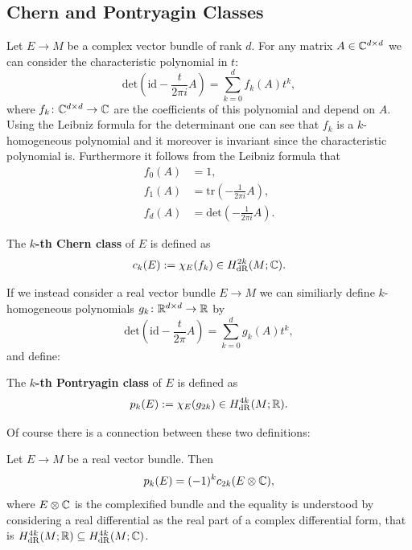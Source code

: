 \subsection{Chern and Pontryagin Classes}

    Let $E \to M$ be a complex vector bundle of rank $d$. For any matrix $A \in \mathbb{C}^{d \times d}$ we can consider the characteristic polynomial in $t$:
    \[
    \mathrm{det}\left( \mathrm{id} - \frac{t}{2\pi i} A\right) = \sum_{k=0}^{d} f_k(A)t^k,
    \]
    where $f_k \colon \mathbb{C}^{d \times d} \to \mathbb{C}$ are the coefficients of this polynomial and depend on $A$. Using the Leibniz formula for the determinant one can see that $f_k$ is a $k$-homogeneous polynomial and it moreover is invariant since the characteristic polynomial is. Furthermore it follows from the Leibniz formula that 
    \begin{align*}
        f_0(A) & = 1, \\
        f_1(A) &= \mathrm{tr}\left(-\frac{1}{2\pi i} A\right), \\
        f_d(A) &= \mathrm{det}\left(-\frac{1}{2\pi i} A\right).
    \end{align*}

\begin{definition}
    The \textbf{$k$-th Chern class} of $E$ is defined as 
    \[
    c_k(E) := \chi_E(f_k) \in H_\mathrm{dR}^{2k}(M;\mathbb{C}).
    \]
\end{definition}

If we instead consider a real vector bundle $E \to M$ we can similiarly define $k$-homogeneous polynomials $g_k \colon \mathbb{R}^{d \times d} \to \mathbb{R}$ by 
\[
    \mathrm{det}\left( \mathrm{id} - \frac{t}{2\pi} A\right) = \sum_{k=0}^{d} g_k(A)t^k,
\]
and define:

\begin{definition}
    The \textbf{$k$-th Pontryagin class} of $E$ is defined as 
    \[
    p_k(E) := \chi_E(g_{2k}) \in H_\mathrm{dR}^{4k}(M;\mathbb{R}).
    \]
\end{definition}

Of course there is a connection between these two definitions:

\begin{lemma}
    Let $E \to M$ be a real vector bundle. Then 
    \[
    p_{k}(E) = (-1)^k c_{2k}(E \otimes \mathbb{C}),
    \]
    where $E \otimes \mathbb{C}$ is the complexified bundle and the equality is understood by considering a real differential as the real part of a complex differential form, that is $H_\mathrm{dR}^{4k}(M;\mathbb{R}) \subseteq H_\mathrm{dR}^{4k}(M;\mathbb{C})$.
\end{lemma}

